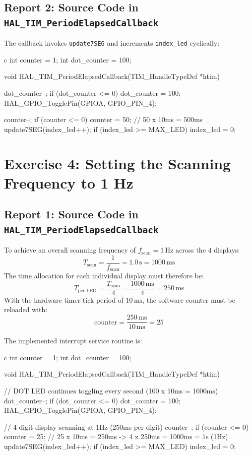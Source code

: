 \documentclass{hcmut-report}
\begin{document}
\subsection*{Report 2: Source Code in \texttt{HAL\_TIM\_PeriodElapsedCallback}}
The callback invokes \texttt{update7SEG} and increments \texttt{index\_led} cyclically:
\begin{code}{c}
int counter = 1;
int dot_counter = 100;

void HAL_TIM_PeriodElapsedCallback(TIM_HandleTypeDef *htim)
{
    dot_counter--;
    if (dot_counter <= 0) {
        dot_counter = 100;
        HAL_GPIO_TogglePin(GPIOA, GPIO_PIN_4);
    }

    counter--;
    if (counter <= 0) {
        counter = 50;  // 50 x 10ms = 500ms
        update7SEG(index_led++);
        if (index_led >= MAX_LED) index_led = 0;
    }
}
\end{code}

\newpage
\section{Exercise 4: Setting the Scanning Frequency to 1 Hz}

\subsection*{Report 1: Source Code in \texttt{HAL\_TIM\_PeriodElapsedCallback}}
To achieve an overall scanning frequency of $f_{\text{scan}} = 1\,\text{Hz}$ across the $4$ displays:
\begin{equation}
    T_{\text{scan}} = \frac{1}{f_{\text{scan}}} = 1.0\,\text{s} = 1000\,\text{ms}
\end{equation}
The time allocation for each individual display must therefore be:
\begin{equation}
    T_{\text{per\_LED}} = \frac{T_{\text{scan}}}{4} = \frac{1000\,\text{ms}}{4} = 250\,\text{ms}
\end{equation}
With the hardware timer tick period of $10\,\text{ms}$, the software counter must be reloaded with:
\begin{equation}
    \text{counter} = \frac{250\,\text{ms}}{10\,\text{ms}} = 25
\end{equation}

The implemented interrupt service routine is:
\begin{code}{c}
int counter = 1;
int dot_counter = 100;

void HAL_TIM_PeriodElapsedCallback(TIM_HandleTypeDef *htim)
{
    // DOT LED continues toggling every second (100 x 10ms = 1000ms)
    dot_counter--;
    if (dot_counter <= 0) {
        dot_counter = 100;
        HAL_GPIO_TogglePin(GPIOA, GPIO_PIN_4);
    }

    // 4-digit display scanning at 1Hz (250ms per digit)
    counter--;
    if (counter <= 0) {
        counter = 25;  // 25 x 10ms = 250ms -> 4 x 250ms = 1000ms = 1s (1Hz)
        update7SEG(index_led++);
        if (index_led >= MAX_LED) index_led = 0;
    }
}
\end{code}
\end{document}
